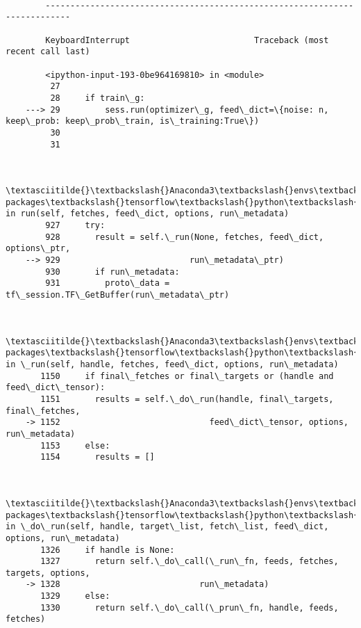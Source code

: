 \documentclass[11pt]{article}
\begin{document}
    \begin{Verbatim}[commandchars=\\\{\}]

        ---------------------------------------------------------------------------

        KeyboardInterrupt                         Traceback (most recent call last)

        <ipython-input-193-0be964169810> in <module>
         27 
         28     if train\_g:
    ---> 29         sess.run(optimizer\_g, feed\_dict=\{noise: n, keep\_prob: keep\_prob\_train, is\_training:True\})
         30 
         31 
    

        \textasciitilde{}\textbackslash{}Anaconda3\textbackslash{}envs\textbackslash{}keras2\textbackslash{}lib\textbackslash{}site-packages\textbackslash{}tensorflow\textbackslash{}python\textbackslash{}client\textbackslash{}session.py in run(self, fetches, feed\_dict, options, run\_metadata)
        927     try:
        928       result = self.\_run(None, fetches, feed\_dict, options\_ptr,
    --> 929                          run\_metadata\_ptr)
        930       if run\_metadata:
        931         proto\_data = tf\_session.TF\_GetBuffer(run\_metadata\_ptr)
    

        \textasciitilde{}\textbackslash{}Anaconda3\textbackslash{}envs\textbackslash{}keras2\textbackslash{}lib\textbackslash{}site-packages\textbackslash{}tensorflow\textbackslash{}python\textbackslash{}client\textbackslash{}session.py in \_run(self, handle, fetches, feed\_dict, options, run\_metadata)
       1150     if final\_fetches or final\_targets or (handle and feed\_dict\_tensor):
       1151       results = self.\_do\_run(handle, final\_targets, final\_fetches,
    -> 1152                              feed\_dict\_tensor, options, run\_metadata)
       1153     else:
       1154       results = []
    

        \textasciitilde{}\textbackslash{}Anaconda3\textbackslash{}envs\textbackslash{}keras2\textbackslash{}lib\textbackslash{}site-packages\textbackslash{}tensorflow\textbackslash{}python\textbackslash{}client\textbackslash{}session.py in \_do\_run(self, handle, target\_list, fetch\_list, feed\_dict, options, run\_metadata)
       1326     if handle is None:
       1327       return self.\_do\_call(\_run\_fn, feeds, fetches, targets, options,
    -> 1328                            run\_metadata)
       1329     else:
       1330       return self.\_do\_call(\_prun\_fn, handle, feeds, fetches)
    


\end{Verbatim}
\end{document}
